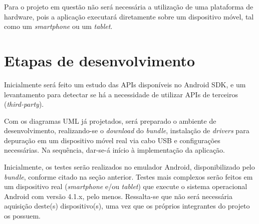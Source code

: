 Para o projeto em questão não será necessária a utilização de uma plataforma de hardware, pois a aplicação executará diretamente sobre um dispositivo móvel, tal como um \textit{smartphone} ou um \textit{tablet}.

\section{Etapas de desenvolvimento}

Inicialmente será feito um estudo das APIs disponíveis no Android SDK, e um levantamento para detectar se há a necessidade de utilizar APIs de terceiros (\textit{third-party}). 

Com os diagramas UML já projetados, será preparado o ambiente de desenvolvimento, realizando-se o \textit{download} do \textit{bundle}, instalação de \textit{drivers} para depuração em um dispositivo móvel real via cabo USB e configurações necessárias. Na sequência, dar-se-á início à implementação da aplicação.

Inicialmente, os testes serão realizados no emulador Android, disponibilizado pelo \textit{bundle}, conforme citado na seção anterior. Testes mais complexos serão feitos em um dispositivo real (\textit{smartphone} e/ou \textit{tablet}) que execute o sistema operacional Android com versão 4.1.x, pelo menos. Ressalta-se que não será necessária aquisição deste(s) dispositivo(s), uma vez que os próprios integrantes do projeto os possuem.